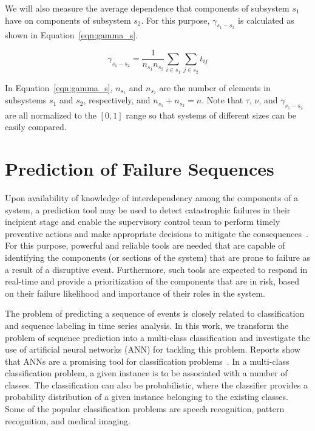 \documentclass[12pt]{elsarticle}
\begin{document}
We will also measure the average dependence that components of subsystem $s_1$ have on components of subsystem $s_2$. For this purpose, $\gamma_{s_1-s_2}$ is calculated as shown in Equation~\eqref{eqn:gamma_s}.

\begin{equation}
\label{eqn:gamma_s}
\gamma_{s_1-s_2} = \frac{1}{n_{s_1}n_{s_2}}\sum\limits_{i \in s_1} \sum\limits_{j \in s_2} t_{ij}
\end{equation}

In Equation~\eqref{eqn:gamma_s}, $n_{s_1}$ and $n_{s_2}$ are the number of elements in subsystems $s_1$ and $s_2$, respectively, and $n_{s_1} + n_{s_2} = n$. Note that $\tau$, $\nu$, and $\gamma_{s_1-s_2}$ are all normalized to the $[0, 1]$ range so that systems of different sizes can be easily compared.

\section{Prediction of Failure Sequences}
\label{sec:pred}
Upon availability of knowledge of interdependency among the components of a system, a prediction tool may be used to detect catastrophic failures in their incipient stage and enable the supervisory control team to perform timely preventive actions and make appropriate decisions to mitigate the consequences~\cite{AfM17,AfM18}. For this purpose, powerful and reliable tools are needed that are capable of identifying the components (or sections of the system) that are prone to failure as a result of a disruptive event. Furthermore, such tools are expected to respond in real-time and provide a prioritization of the components that are in risk, based on their failure likelihood and importance of their roles in the system.

The problem of predicting a sequence of events is closely related to classification and sequence labeling in time series analysis. In this work, we transform the problem of sequence prediction into a multi-class classification and investigate the use of artificial neural networks (ANN) for tackling this problem. Reports show that ANNs are a promising tool for classification problems~\cite{OuM07}. In a multi-class classification problem, a given instance is to be associated with a number of classes. The classification can also be probabilistic, where the classifier provides a probability distribution of a given instance belonging to the existing classes. Some of the popular classification problems are speech recognition, pattern recognition, and medical imaging.
\end{document}
